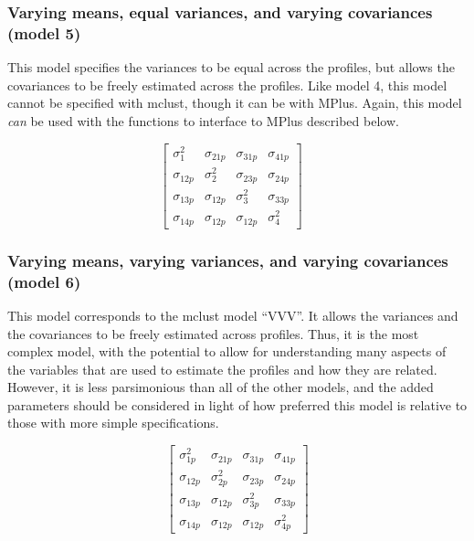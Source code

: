 \documentclass[]{msu-thesis}
\theoremstyle{definition}
\theoremstyle{definition}
\theoremstyle{definition}
\theoremstyle{remark}
\begin{document}
\subsubsection{Varying means, equal variances, and varying covariances
(model
5)}\label{varying-means-equal-variances-and-varying-covariances-model-5}

This model specifies the variances to be equal across the profiles, but
allows the covariances to be freely estimated across the profiles. Like
model 4, this model cannot be specified with mclust, though it can be
with MPlus. Again, this model \emph{can} be used with the functions to
interface to MPlus described below.

\[
\left[ \begin{matrix} { \sigma  }_{ 1 }^{ 2 } & { \sigma  }_{ 21p } & { \sigma  }_{ 31p } & { \sigma  }_{ 41p } \\ { \sigma  }_{ 12p } & { \sigma  }_{ 2 }^{ 2 } & { \sigma  }_{ 23p } & { \sigma  }_{ 24p } \\ { \sigma  }_{ 13p } & { \sigma  }_{ 12p } & { \sigma  }_{ 3 }^{ 2 } & { \sigma  }_{ 33p } \\ { \sigma  }_{ 14p } & { \sigma  }_{ 12p } & { \sigma  }_{ 12p } & { \sigma  }_{ 4 }^{ 2 } \end{matrix} \right] \quad 
\]

\subsubsection{Varying means, varying variances, and varying covariances
(model
6)}\label{varying-means-varying-variances-and-varying-covariances-model-6}

This model corresponds to the mclust model ``VVV''. It allows the
variances and the covariances to be freely estimated across profiles.
Thus, it is the most complex model, with the potential to allow for
understanding many aspects of the variables that are used to estimate
the profiles and how they are related. However, it is less parsimonious
than all of the other models, and the added parameters should be
considered in light of how preferred this model is relative to those
with more simple specifications.

\[
\left[ \begin{matrix} { \sigma  }_{ 1p }^{ 2 } & { \sigma  }_{ 21p } & { \sigma  }_{ 31p } & { \sigma  }_{ 41p } \\ { \sigma  }_{ 12p } & { \sigma  }_{ 2p }^{ 2 } & { \sigma  }_{ 23p } & { \sigma  }_{ 24p } \\ { \sigma  }_{ 13p } & { \sigma  }_{ 12p } & { \sigma  }_{ 3p }^{ 2 } & { \sigma  }_{ 33p } \\ { \sigma  }_{ 14p } & { \sigma  }_{ 12p } & { \sigma  }_{ 12p } & { \sigma  }_{ 4p }^{ 2 } \end{matrix} \right] 
\]
\end{document}
